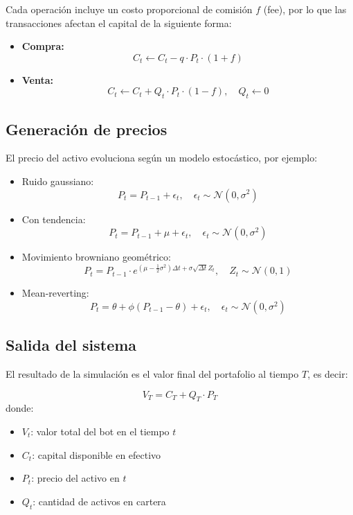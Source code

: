 \documentclass[a4paper,12pt]{article}
\begin{document}
Cada operación incluye un costo proporcional de comisión $f$ (fee), por lo que las transacciones afectan el capital de la siguiente forma:

\begin{itemize}
    \item \textbf{Compra:}
    \[
    C_t \leftarrow C_t - q \cdot P_t \cdot (1 + f)
    \]
    \item \textbf{Venta:}
    \[
    C_t \leftarrow C_t + Q_t \cdot P_t \cdot (1 - f), \quad Q_t \leftarrow 0
    \]
\end{itemize}

\subsection*{Generación de precios}

El precio del activo evoluciona según un modelo estocástico, por ejemplo:

\begin{itemize}
    \item Ruido gaussiano:
    \[
    P_t = P_{t-1} + \epsilon_t, \quad \epsilon_t \sim \mathcal{N}(0, \sigma^2)
    \]
    
    \item Con tendencia:
    \[
    P_t = P_{t-1} + \mu + \epsilon_t, \quad \epsilon_t \sim \mathcal{N}(0, \sigma^2)
    \]
    
    \item Movimiento browniano geométrico:
    \[
    P_t = P_{t-1} \cdot e^{(\mu - \frac{1}{2} \sigma^2)\Delta t + \sigma \sqrt{\Delta t} Z_t}, \quad Z_t \sim \mathcal{N}(0, 1)
    \]
    
    \item Mean-reverting:
    \[
    P_t = \theta + \phi(P_{t-1} - \theta) + \epsilon_t, \quad \epsilon_t \sim \mathcal{N}(0, \sigma^2)
    \]
\end{itemize}

\subsection*{Salida del sistema}

El resultado de la simulación es el valor final del portafolio al tiempo $T$, es decir:

\[
V_T = C_T + Q_T \cdot P_T
\]
donde:
\begin{itemize}
\item \( V_t \): valor total del bot en el tiempo \( t \)
\item \( C_t \): capital disponible en efectivo
\item \( P_t \): precio del activo en \( t \)
\item \( Q_t \): cantidad de activos en cartera
\end{itemize}
\end{document}
